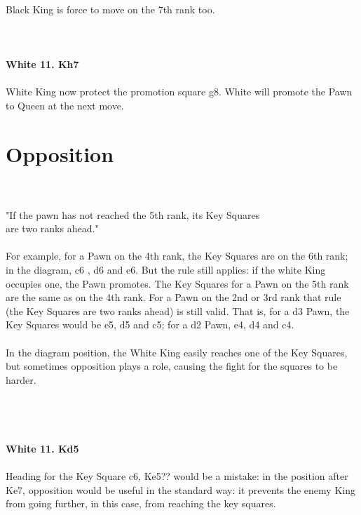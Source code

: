\documentclass{article}
\begin{document}
\\
Black King is force to move on the 7th rank too.\\
\\

\\
\\
\textbf{White 11. Kh7}\\
\\
White King now protect the promotion square g8. White will promote the Pawn to Queen at the next move.\section{ Opposition}

\\
\\
"If the pawn has not reached the 5th rank, its Key Squares\\are two ranks ahead."\\\\For example, for a Pawn on the 4th rank, the Key Squares are on the 6th rank; in the diagram, c6 , d6 and e6. But the rule still applies: if the white King occupies one, the Pawn promotes. The Key Squares for a Pawn on the 5th rank are the same as on the 4th rank. For a Pawn on the 2nd or 3rd rank that rule (the Key Squares are two ranks ahead) is still valid. That is, for a d3 Pawn, the Key Squares would be e5, d5 and c5; for a d2 Pawn, e4, d4 and c4.\\\\In the diagram position, the White King easily reaches one of the Key Squares, but sometimes opposition plays a role, causing the fight for the squares to be harder.\\\\
\\

\\
\\
\textbf{White 11. Kd5}\\
\\
Heading for the Key Square c6, Ke5?? would be a mistake: in the position after Ke7, opposition would be useful in the standard way: it prevents the enemy King from going further, in this case, from reaching the key squares.\\\\
\\

\end{document}
